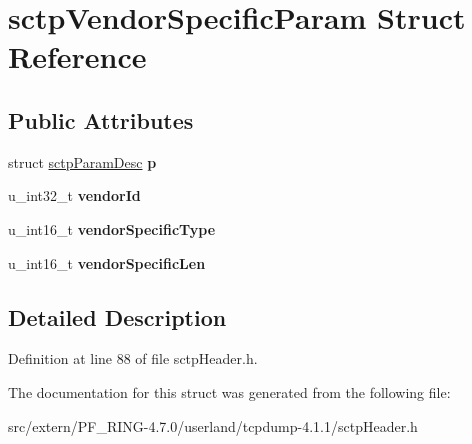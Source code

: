 \hypertarget{structsctp_vendor_specific_param}{
\section{sctpVendorSpecificParam Struct Reference}
\label{structsctp_vendor_specific_param}
}
\subsection*{Public Attributes}
\begin{DoxyCompactItemize}
\item 
\hypertarget{structsctp_vendor_specific_param_a9e418080103de47876a88b99436b01d0}{
struct \hyperlink{structsctp_param_desc}{sctpParamDesc} {\bfseries p}}
\label{structsctp_vendor_specific_param_a9e418080103de47876a88b99436b01d0}

\item 
\hypertarget{structsctp_vendor_specific_param_aa14c8f9e7bb5e0f07024679df27ba386}{
u\_\-int32\_\-t {\bfseries vendorId}}
\label{structsctp_vendor_specific_param_aa14c8f9e7bb5e0f07024679df27ba386}

\item 
\hypertarget{structsctp_vendor_specific_param_aa5d1122c227204d033a3e1646ee6d151}{
u\_\-int16\_\-t {\bfseries vendorSpecificType}}
\label{structsctp_vendor_specific_param_aa5d1122c227204d033a3e1646ee6d151}

\item 
\hypertarget{structsctp_vendor_specific_param_adb186e792609704420da50388840f7c9}{
u\_\-int16\_\-t {\bfseries vendorSpecificLen}}
\label{structsctp_vendor_specific_param_adb186e792609704420da50388840f7c9}

\end{DoxyCompactItemize}


\subsection{Detailed Description}


Definition at line 88 of file sctpHeader.h.



The documentation for this struct was generated from the following file:\begin{DoxyCompactItemize}
\item 
src/extern/PF\_\-RING-\/4.7.0/userland/tcpdump-\/4.1.1/sctpHeader.h\end{DoxyCompactItemize}
